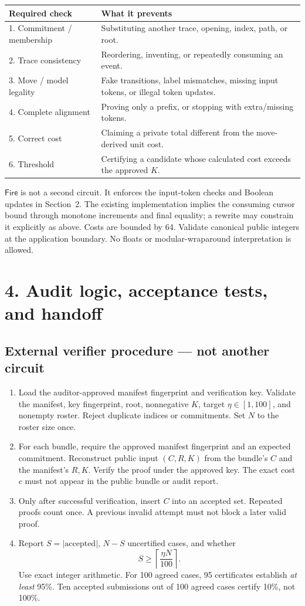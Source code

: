 \documentclass[10pt,a4paper]{article}
\begin{document}
\small
\begin{tabularx}{\textwidth}{@{}p{}X@{}}
\toprule
Required check & What it prevents\\
\midrule
1. Commitment / membership & Substituting another trace, opening, index, path, or root.\\
2. Trace consistency & Reordering, inventing, or repeatedly consuming an event.\\
3. Move / model legality & Fake transitions, label mismatches, missing input tokens, or illegal token updates.\\
4. Complete alignment & Proving only a prefix, or stopping with extra/missing tokens.\\
5. Correct cost & Claiming a private total different from the move-derived unit cost.\\
6. Threshold & Certifying a candidate whose calculated cost exceeds the approved $K$.\\
\bottomrule
\end{tabularx}

$\mathsf{Fire}$ is not a second circuit. It enforces the input-token checks and Boolean updates in Section~2. The existing implementation implies the consuming cursor bound through monotone increments and final equality; a rewrite may constrain it explicitly as above. Costs are bounded by 64. Validate canonical public integers at the application boundary. No floats or modular-wraparound interpretation is allowed.

\clearpage
\normalsize
\section*{4. Audit logic, acceptance tests, and handoff}
\subsection*{External verifier procedure --- not another circuit}
\begin{enumerate}
\item Load the auditor-approved manifest fingerprint and verification key. Validate the manifest, key fingerprint, root, nonnegative $K$, target $\eta\in[1,100]$, and nonempty roster. Reject duplicate indices or commitments. Set $N$ to the roster size once.
\item For each bundle, require the approved manifest fingerprint and an expected commitment. Reconstruct public input $(C,R,K)$ from the bundle's $C$ and the manifest's $R,K$. Verify the proof under the approved key. The exact cost $c$ must not appear in the public bundle or audit report.
\item Only after successful verification, insert $C$ into an accepted set. Repeated proofs count once. A previous invalid attempt must not block a later valid proof.
\item Report $S=|\mathrm{accepted}|$, $N-S$ uncertified cases, and whether
\[
S\geq\left\lceil\frac{\eta N}{100}\right\rceil.
\]
Use exact integer arithmetic. For 100 agreed cases, 95 certificates establish \emph{at least} 95\%. Ten accepted submissions out of 100 agreed cases certify 10\%, not 100\%.
\end{enumerate}
\end{document}
